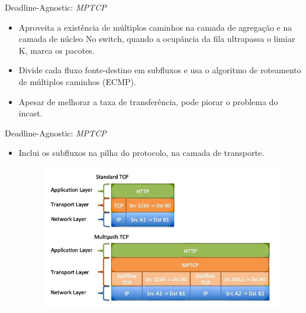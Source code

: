 \documentclass[aspectratio=169]{beamer}
\begin{document}
	
	\begin{frame} {Deadline-Agnostic: \textit{MPTCP}}
	                
	
	    \Large
	    \begin{itemize}
	                           
	        \item
	            Aproveita a existência de múltiplos caminhos na camada de agregação e na camada de núcleo        
	            No switch, quando a ocupância da fila ultrapassa o limiar K, marca os pacotes.
	        \item
	            Divide cada fluxo fonte-destino em subfluxos e usa o algoritmo de roteamento de múltiplos caminhos (ECMP).
	        \item
	            Apesar de melhorar a taxa de transferência, pode piorar o problema do incast.
	
	    \end{itemize}
	  
	\end{frame}
	  
	\begin{frame} {Deadline-Agnostic: \textit{MPTCP}}
	    
	    \Large
	    \begin{itemize}
	                           
	    \item
	      Inclui os subfluxos na pilha do protocolo, na camada de transporte.
	  
	    \begin{figure}[ht]    
	        \includegraphics[scale=0.5]{imagens/mptcp_subfluxo.jpg}
	    \end{figure}
	        
	  \end{itemize}
	    
	\end{frame}  
\end{document}
